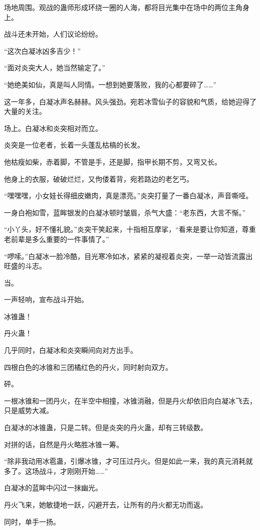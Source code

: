 \begin{this_body}
场地周围。观战的蛊师形成环绕一圈的人海，都将目光集中在场中的两位主角身上。

战斗还未开始，人们议论纷纷。

“这次白凝冰凶多吉少！”

“面对炎突大人，她当然输定了。”

“她绝美如仙，真是叫人同情。一想到她要落败，我的心都要碎了……”

这一年多，白凝冰声名赫赫。风头强劲。宛若冰雪仙子的容貌和气质，给她迎得了大量的关注。

场上。白凝冰和炎突相对而立。

炎突是一位老者，长着一头蓬乱枯槁的长发。

他枯瘦如柴，赤着脚，不管是手，还是脚，指甲长期不剪，又弯又长。

他身上的衣服，破破烂烂，又佝偻着背，宛若路边的老乞丐。

“嘿嘿嘿，小女娃长得细皮嫩肉，真是漂亮。”炎突打量了一番白凝冰，声音嘶哑。

一身白袍如雪，蓝眸银发的白凝冰顿时皱眉，杀气大盛：“老东西，大言不惭。”

“小丫头，好不懂礼貌。”炎突干笑起来，十指相互摩挲，“看来是要让你知道，尊重老前辈是多么重要的一件事情了。”

“啰嗦。”白凝冰一脸冷酷，目光寒冷如冰，紧紧的凝视着炎突，一举一动皆流露出旺盛的斗志。

当。

一声轻响，宣布战斗开始。

冰锥蛊！

丹火蛊！

几乎同时，白凝冰和炎突瞬间向对方出手。

四根白色的冰锥和三团橘红色的丹火，同时射向双方。

砰。

一根冰锥和一团丹火，在半空中相撞，冰锥消融，但是丹火却依旧向白凝冰飞去，只是威势大减。

白凝冰的冰锥蛊，只是二转。但是炎突的丹火蛊，却有三转级数。

对拼的话，自然是丹火略胜冰锥一筹。

“除非我动用冰雹蛊，引爆冰锥，才可压过丹火。但是如此一来，我的真元消耗就多了。这场战斗，才刚刚开始……”

白凝冰的蓝眸中闪过一抹幽光。

丹火飞来，她敏捷地一跃，闪避开去，让所有的丹火都无功而返。

同时，单手一扬。


\end{this_body}
